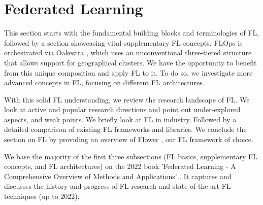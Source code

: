 \section{Federated Learning}\label{section:federated_learning}

This section starts with the fundamental building blocks and terminologies of FL,
followed by a section showcasing vital supplementary FL concepts.
FLOps is orchestrated via Oakestra \cite{paper:oakestra_usenix}, which uses an unconventional
three-tiered structure that allows support for geographical clusters.
We have the opportunity to benefit from this unique composition and apply FL to it.
To do so, we investigate more advanced concepts in FL, focusing on different FL architectures.

With this solid FL understanding, we review the research landscape of FL.
We look at active and popular research directions and point out under-explored aspects,
and weak points.
We briefly look at FL in industry.
Followed by a detailed comparison of existing FL frameworks and libraries.
We conclude the section on FL by providing an overview of Flower \cite{flower_docs}, our FL framework of choice.

We base the majority of the first three subsections
(FL basics, supplementary FL concepts, and FL architectures) on the 2022 book
'Federated Learning - A Comprehensive Overview of Methods and Applications' \cite{book:fl}.
It captures and discusses the history and progress of FL research and state-of-the-art FL techniques (up to 2022).








